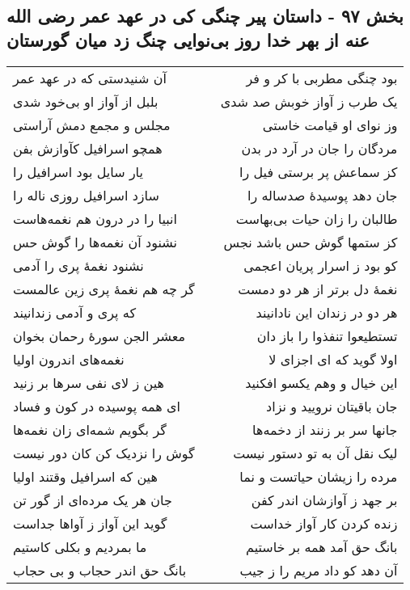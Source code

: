 \begin{center}
\section*{بخش ۹۷ - داستان پیر چنگی کی در عهد عمر رضی الله عنه از بهر خدا روز بی‌نوایی چنگ زد میان گورستان}
\label{sec:sh097}
\begin{longtable}{l p{0.5cm} r}
آن شنیدستی که در عهد عمر
&&
بود چنگی مطربی با کر و فر
\\
بلبل از آواز او بی‌خود شدی
&&
یک طرب ز آواز خوبش صد شدی
\\
مجلس و مجمع دمش آراستی
&&
وز نوای او قیامت خاستی
\\
همچو اسرافیل کآوازش بفن
&&
مردگان را جان در آرد در بدن
\\
یار سایل بود اسرافیل را
&&
کز سماعش پر برستی فیل را
\\
سازد اسرافیل روزی ناله را
&&
جان دهد پوسیدهٔ صدساله را
\\
انبیا را در درون هم نغمه‌هاست
&&
طالبان را زان حیات بی‌بهاست
\\
نشنود آن نغمه‌ها را گوش حس
&&
کز ستمها گوش حس باشد نجس
\\
نشنود نغمهٔ پری را آدمی
&&
کو بود ز اسرار پریان اعجمی
\\
گر چه هم نغمهٔ پری زین عالمست
&&
نغمهٔ دل برتر از هر دو دمست
\\
که پری و آدمی زندانیند
&&
هر دو در زندان این نادانیند
\\
معشر الجن سورهٔ رحمان بخوان
&&
تستطیعوا تنفذوا را باز دان
\\
نغمه‌های اندرون اولیا
&&
اولا گوید که ای اجزای لا
\\
هین ز لای نفی سرها بر زنید
&&
این خیال و وهم یکسو افکنید
\\
ای همه پوسیده در کون و فساد
&&
جان باقیتان نرویید و نزاد
\\
گر بگویم شمه‌ای زان نغمه‌ها
&&
جانها سر بر زنند از دخمه‌ها
\\
گوش را نزدیک کن کان دور نیست
&&
لیک نقل آن به تو دستور نیست
\\
هین که اسرافیل وقتند اولیا
&&
مرده را زیشان حیاتست و نما
\\
جان هر یک مرده‌ای از گور تن
&&
بر جهد ز آوازشان اندر کفن
\\
گوید این آواز ز آواها جداست
&&
زنده کردن کار آواز خداست
\\
ما بمردیم و بکلی کاستیم
&&
بانگ حق آمد همه بر خاستیم
\\
بانگ حق اندر حجاب و بی حجاب
&&
آن دهد کو داد مریم را ز جیب
\\

\end{longtable}
\end{center}
